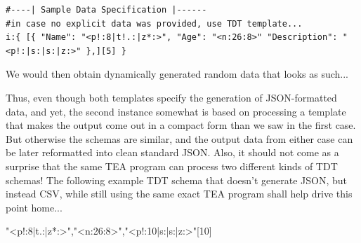 \documentclass[a4paper, 18pt]{book} %
\begin{document}
  
    \begin{tcolorbox}[teaterminalstyle, title=Sample Inline TDT template specification, breakable]
  \begin{lstlisting}[language=TEA,breaklines=true,]
#----| Sample Data Specification |------
#in case no explicit data was provided, use TDT template...
i:{ [{ "Name": "<p!:8|t!.:|z*:>", "Age": "<n:26:8>" "Description": "<p!:|s:|s:|z:>" },][5] }
   \end{lstlisting}
  \end{tcolorbox}
  

\vspace{2em}

We would then obtain dynamically generated random data that looks as such...


   \begin{tcbverbatim}
  \end{tcbverbatim} 
 
 
 \vspace{2em}
 
 Thus, even though both templates specify the generation of JSON-formatted data, and yet, the second instance somewhat is based on processing a template that makes the output come out in a compact form than we saw in the first case. But otherwise the schemas are similar, and the output data from either case can be later reformatted into clean standard JSON. Also, it should not come as a surprise that the same TEA program can process two different kinds of TDT schemas! The following example TDT schema that doesn't generate JSON, but instead CSV, while still using the same exact TEA program shall help drive this point home...
 
  \begin{tcbverbatim}[title=Example Data Generation Schema for CSV-like data]
"<p!:8|t.:|z*:>","<n:26:8>","<p!:10|s:|s:|z:>"[10]
  \end{tcbverbatim}
  
\end{document}

